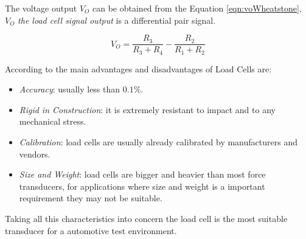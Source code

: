 	The voltage output $V_{O}$ can be obtained from the Equation \ref{eqn:voWheatstone}, $V_{O}$ \textit{the load cell signal output} is a differential pair signal.

	\begin{equation}\label{eqn:voWheatstone}
		V_{O}=\frac{ R_{3} }{ R_{3} + R_{4} } - \frac{ R_{2} }{ R_{1} + R_{2}}
	\end{equation}

	According to \cite{dillon1989load} the main advantages and disadvantages of Load Cells are: 

	\begin{itemize}
		\item \textit{Accuracy}: usually less than $0.1\%$.\label{itm:accuracy-load-cell}
		\item \textit{Rigid in Construction}: it is extremely resistant to impact and to any mechanical stress.\label{itm:rigid-load-cell}
		\item \textit{Calibration}: load cells are usually already calibrated by manufacturers and vendors.\label{itm:calibration-load-cell}
		\item \textit{Size and Weight}: load cells are bigger and heavier than most force transducers, for applications where size and weight is a important requirement they may not be suitable.\label{itm:size-and-weight}
	\end{itemize}

	Taking all this characteristics into concern the load cell is the most suitable transducer for a automotive test environment.